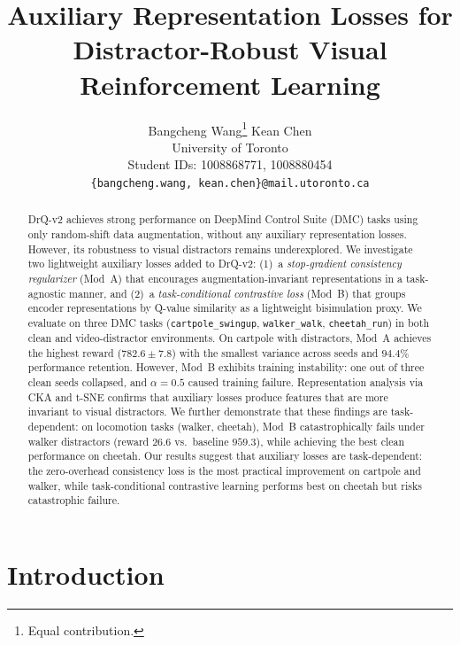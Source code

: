 \documentclass{article}
\title{Auxiliary Representation Losses for\\Distractor-Robust Visual Reinforcement Learning}
\author{
  Bangcheng Wang\thanks{Equal contribution.} \quad Kean Chen\footnotemark[1]\\
  University of Toronto\\
  Student IDs: 1008868771, 1008880454\\
  \texttt{\{bangcheng.wang, kean.chen\}@mail.utoronto.ca}
}
\begin{document}
\maketitle

\begin{abstract}
\let\thefootnote\relax{}
DrQ-v2 achieves strong performance on DeepMind Control Suite (DMC) tasks using only random-shift data augmentation, without any auxiliary representation losses.
However, its robustness to visual distractors remains underexplored.
We investigate two lightweight auxiliary losses added to DrQ-v2:
(1)~a \emph{stop-gradient consistency regularizer} (Mod~A) that encourages augmentation-invariant representations in a task-agnostic manner, and
(2)~a \emph{task-conditional contrastive loss} (Mod~B) that groups encoder representations by Q-value similarity as a lightweight bisimulation proxy.
We evaluate on three DMC tasks (\texttt{cartpole\_swingup}, \texttt{walker\_walk}, \texttt{cheetah\_run}) in both clean and video-distractor environments.
On cartpole with distractors, Mod~A achieves the highest reward ($782.6 \pm 7.8$) with the smallest variance across seeds and $94.4\%$ performance retention.
However, Mod~B exhibits training instability: one out of three clean seeds collapsed, and $\alpha=0.5$ caused training failure.
Representation analysis via CKA and t-SNE confirms that auxiliary losses produce features that are more invariant to visual distractors.
We further demonstrate that these findings are task-dependent: on locomotion tasks (walker, cheetah), Mod~B catastrophically fails under walker distractors (reward $26.6$ vs.\ baseline $959.3$), while achieving the best clean performance on cheetah.
Our results suggest that auxiliary losses are task-dependent: the zero-overhead consistency loss is the most practical improvement on cartpole and walker, while task-conditional contrastive learning performs best on cheetah but risks catastrophic failure.
\end{abstract}

\section{Introduction}
\label{sec:intro}
\end{document}
